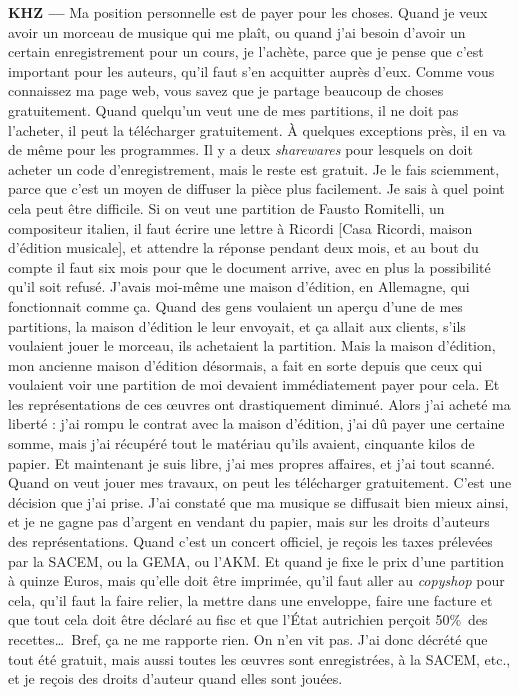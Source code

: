 \documentclass[a4paper,12pt]{article}
\begin{document}
\textbf{KHZ ---} Ma position personnelle est de payer pour les choses. Quand je veux avoir un morceau de musique qui me plaît, ou quand j'ai besoin d'avoir un certain enregistrement pour un cours, je l'achète, parce que je pense que c'est important pour les auteurs, qu'il faut s'en acquitter auprès d'eux. Comme vous connaissez ma page web, vous savez que je partage beaucoup de choses gratuitement. Quand quelqu'un veut une de mes partitions, il ne doit pas l'acheter, il peut la télécharger gratuitement. À quelques exceptions près, il en va de même pour les programmes. Il y a deux \emph{sharewares} pour lesquels on doit acheter un code d'enregistrement, mais le reste est gratuit. Je le fais sciemment, parce que c'est un moyen de diffuser la pièce plus facilement. Je sais à quel point cela peut être difficile. Si on veut une partition de Fausto Romitelli, un compositeur italien, il faut écrire une lettre à Ricordi [Casa Ricordi, maison d'édition musicale], et attendre la réponse pendant deux mois, et au bout du compte il faut six mois pour que le document arrive, avec en plus la possibilité qu'il soit refusé. J'avais moi-même une maison d'édition, en Allemagne, qui fonctionnait comme ça. Quand des gens voulaient un aperçu d'une de mes partitions, la maison d'édition le leur envoyait, et ça allait aux clients, s'ils voulaient jouer le morceau, ils achetaient la partition. Mais la maison d'édition, mon ancienne maison d'édition désormais, a fait en sorte depuis que ceux qui voulaient voir une partition de moi devaient immédiatement payer pour cela. Et les représentations de ces œuvres ont drastiquement diminué. Alors j'ai acheté ma liberté : j'ai rompu le contrat avec la maison d'édition, j'ai dû payer une certaine somme, mais j'ai récupéré tout le matériau qu'ils avaient, cinquante kilos de papier. Et maintenant je suis libre, j'ai mes propres affaires, et j'ai tout scanné. Quand on veut jouer mes travaux, on peut les télécharger gratuitement. C'est une décision que j'ai prise. J'ai constaté que ma musique se diffusait bien mieux ainsi, et je ne gagne pas d'argent en vendant du papier, mais sur les droits d'auteurs des représentations. Quand c'est un concert officiel, je reçois les taxes prélevées par la SACEM, ou la GEMA, ou l'AKM. Et quand je fixe le prix d'une partition à quinze Euros, mais qu'elle doit être imprimée, qu'il faut aller au \emph{copyshop} pour cela, qu'il faut la faire relier, la mettre dans une enveloppe, faire une facture et que tout cela doit être déclaré au fisc et que l’État autrichien perçoit 50\%~des recettes\dots~Bref, ça ne me rapporte rien. On n'en vit pas. J'ai donc décrété que tout été gratuit, mais aussi toutes les œuvres sont enregistrées, à la SACEM, etc., et je reçois des droits d'auteur quand elles sont jouées.
\end{document}
